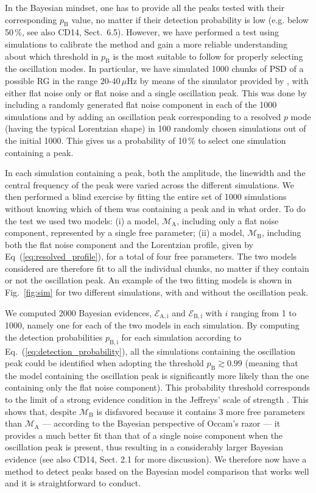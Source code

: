 \documentclass[structabstract]{aa}
\newcommand{\evid}{\mathcal{E}}
\newcommand{\model}{\mathcal{M}}
\newcommand{\muhz}{$\mu$Hz}
\newcommand{\pb}{p_\mathrm{B}}
\begin{document}
In the Bayesian mindset, one has to provide all the peaks tested with their corresponding $\pb$ value, no matter if their detection probability is low (e.g. below 50\,\%, see also CD14, Sect.~6.5). However, we have performed a test using simulations to calibrate the method and gain a more reliable understanding about which threshold in $\pb$ is the most suitable to follow for properly selecting the oscillation modes. In particular, we have simulated 1000 chunks of PSD of a possible RG in the range $20$-$40$\,\muhz\,\,by means of the simulator provided by \cite{DeRidder06}, with either flat noise only or flat noise and a single oscillation peak. This was done by including a randomly generated flat noise component in each of the 1000 simulations and by adding an oscillation peak corresponding to a resolved $p$ mode (having the typical Lorentzian shape) in 100 randomly chosen simulations out of the initial 1000. This gives us a probability of 10\,\% to select one simulation containing a peak. 

In each simulation containing a peak, both the amplitude, the linewidth and the central frequency of the peak were varied across the different simulations. We then performed a blind exercise by fitting the entire set of 1000 simulations without knowing which of them was containing a peak and in what order. To do the test we used two models: (i) a model, $\model_\mathrm{A}$, including only a flat noise component, represented by a single free parameter; (ii) a model, $\model_\mathrm{B}$, including both the flat noise component and the Lorentzian profile, given by Eq~(\ref{eq:resolved_profile}), for a total of four free parameters. The two models considered are therefore fit to all the individual chunks, no matter if they contain or not the oscillation peak. An example of the two fitting models is shown in Fig.~\ref{fig:sim} for two different simulations, with and without the oscillation peak.

We computed 2000 Bayesian evidences, $\evid_\mathrm{A,i}$ and $\evid_\mathrm{B,i}$ with $i$ ranging from 1 to 1000, namely one for each of the two models in each simulation. By computing the detection probabilities $p_\mathrm{B,i}$ for each simulation according to Eq.~(\ref{eq:detection_probability}), all the simulations containing the oscillation peak could be identified when adopting the threshold $\pb \gtrsim 0.99$ (meaning that the model containing the oscillation peak is significantly more likely than the one containing only the flat noise component). This probability threshold corresponds to the limit of a strong evidence condition in the Jeffreys' scale of strength \citep{Jeffreys61}. This shows that, despite $\model_\mathrm{B}$ is disfavored because it contains 3 more free parameters than $\model_\mathrm{A}$ --- according to the Bayesian perspective of Occam's razor --- it provides a much better fit than that of a single noise component when the oscillation peak is present, thus resulting in a considerably larger Bayesian evidence (see also CD14, Sect. 2.1 for more discussion). We therefore now have a method to detect peaks based on the Bayesian model comparison that works well and it is straightforward to conduct.
\end{document}

